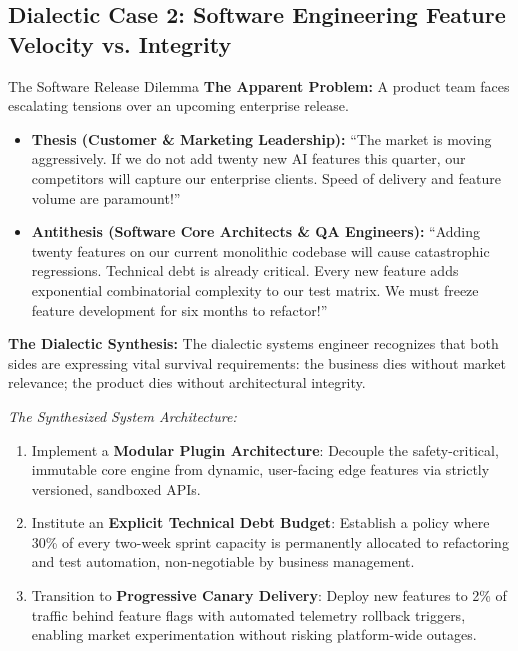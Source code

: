 \subsection{Dialectic Case 2: Software Engineering Feature Velocity vs. Integrity}
\begin{dialecticbox}{The Software Release Dilemma}
\textbf{The Apparent Problem:} A product team faces escalating tensions over an upcoming enterprise release.

\begin{itemize}[leftmargin=1.5em]
    \item \textbf{Thesis (Customer \& Marketing Leadership):}
    ``The market is moving aggressively. If we do not add twenty new AI features this quarter, our competitors will capture our enterprise clients. Speed of delivery and feature volume are paramount!''
    \item \textbf{Antithesis (Software Core Architects \& QA Engineers):}
    ``Adding twenty features on our current monolithic codebase will cause catastrophic regressions. Technical debt is already critical. Every new feature adds exponential combinatorial complexity to our test matrix. We must freeze feature development for six months to refactor!''
\end{itemize}

\textbf{The Dialectic Synthesis:}
The dialectic systems engineer recognizes that both sides are expressing vital survival requirements: the business dies without market relevance; the product dies without architectural integrity.

\textit{The Synthesized System Architecture:}
\begin{enumerate}[leftmargin=1.5em]
    \item Implement a \textbf{Modular Plugin Architecture}: Decouple the safety-critical, immutable core engine from dynamic, user-facing edge features via strictly versioned, sandboxed APIs.
    \item Institute an \textbf{Explicit Technical Debt Budget}: Establish a policy where 30\% of every two-week sprint capacity is permanently allocated to refactoring and test automation, non-negotiable by business management.
    \item Transition to \textbf{Progressive Canary Delivery}: Deploy new features to 2\% of traffic behind feature flags with automated telemetry rollback triggers, enabling market experimentation without risking platform-wide outages.
\end{enumerate}
\end{dialecticbox}

